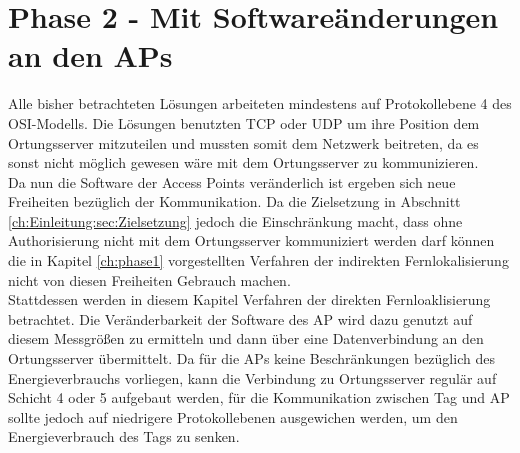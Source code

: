 \chapter{Phase 2 - Mit Softwareänderungen an den APs}
\label{ch:phase2}
Alle bisher betrachteten Lösungen arbeiteten mindestens auf Protokollebene 4 des OSI-Modells.
Die Lösungen benutzten TCP oder UDP um ihre Position dem Ortungsserver mitzuteilen und mussten somit dem Netzwerk beitreten, da es sonst nicht möglich gewesen wäre mit dem Ortungsserver zu kommunizieren.\\
Da nun die Software der Access Points veränderlich ist ergeben sich neue Freiheiten bezüglich der Kommunikation.
Da die Zielsetzung in Abschnitt \ref{ch:Einleitung:sec:Zielsetzung} jedoch die Einschränkung macht, dass ohne Authorisierung nicht mit dem Ortungsserver kommuniziert werden darf können die in Kapitel \ref{ch:phase1} vorgestellten Verfahren der indirekten Fernlokalisierung nicht von diesen Freiheiten Gebrauch machen.\\
Stattdessen werden in diesem Kapitel Verfahren der direkten Fernloaklisierung betrachtet.
Die Veränderbarkeit der Software des AP wird dazu genutzt auf diesem Messgrößen zu ermitteln und dann über eine Datenverbindung an den Ortungsserver übermittelt.
Da für die APs keine Beschränkungen bezüglich des Energieverbrauchs vorliegen, kann die Verbindung zu Ortungsserver regulär auf Schicht 4 oder 5 aufgebaut werden, für die Kommunikation zwischen Tag und AP sollte jedoch auf niedrigere Protokollebenen ausgewichen werden, um den Energieverbrauch des Tags zu senken. \\


